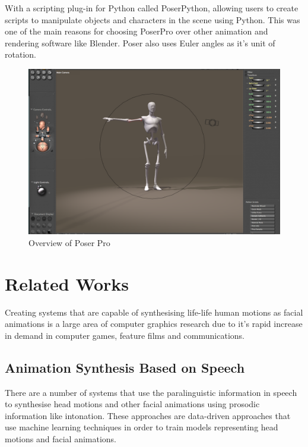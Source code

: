 \documentclass[bsc,frontabs,twoside,singlespacing,parskip]{infthesis}
\begin{document}
With a scripting plug-in for Python called PoserPython, \cite{poser_python} allowing users to create scripts to manipulate objects and characters in the scene using Python. This was one of the main reasons for choosing PoserPro over other animation and rendering software like Blender. Poser also uses Euler angles as it's unit of rotation.

\begin{figure}
	\centering
		\includegraphics[width=1.0\textwidth]{poser.png}
		\caption{Overview of Poser Pro}
\end{figure}

%

\section{Related Works}

Creating systems that are capable of synthesising life-life human motions as facial animations is a large area of computer graphics research due to it's rapid increase in demand in computer games, feature films and communications.

\subsection{Animation Synthesis Based on Speech}

There are a number of systems that use the paralinguistic information in speech to synthesise head motions and other facial animations using prosodic information like intonation. These approaches are data-driven approaches that use machine learning techniques in order to train models representing head motions and facial animations.
\end{document}
